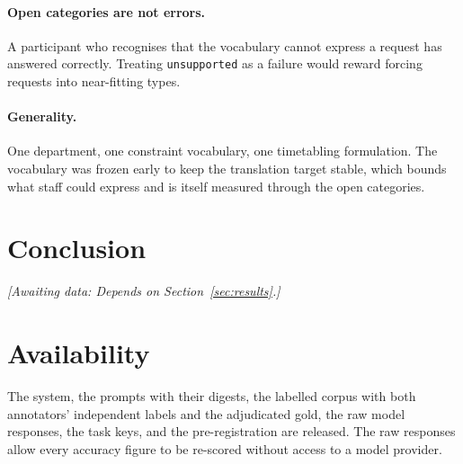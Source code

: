 \documentclass[acmsmall,screen,review,anonymous]{acmart}
\newcommand{\awaitingdata}[1]{%
  \par\noindent\textit{[Awaiting data: #1]}\par}
\begin{document}
\paragraph{Open categories are not errors.} A participant who recognises that
the vocabulary cannot express a request has answered correctly. Treating
\texttt{unsupported} as a failure would reward forcing requests into
near-fitting types.

\paragraph{Generality.} One department, one constraint vocabulary, one
timetabling formulation. The vocabulary was frozen early to keep the
translation target stable, which bounds what staff could express and is itself
measured through the open categories.

\section{Conclusion}
\awaitingdata{Depends on Section~\ref{sec:results}.}

\section*{Availability}

The system, the prompts with their digests, the labelled corpus with both
annotators' independent labels and the adjudicated gold, the raw model
responses, the task keys, and the pre-registration are released. The raw
responses allow every accuracy figure to be re-scored without access to a
model provider.



\end{document}
